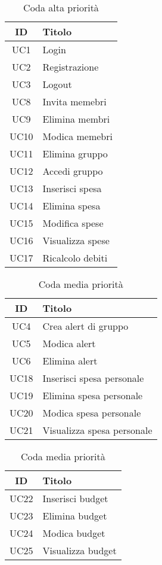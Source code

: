     \begin{table}[h]
        \centering
        \begin{tabular}{|c|l|}
        \hline
        \textbf{ID} & \textbf{Titolo} \\ \hline
        UC1 & Login\\ \hline
        UC2 & Registrazione \\ \hline
        UC3 & Logout \\ \hline
        UC8 & Invita memebri \\ \hline
        UC9 & Elimina membri \\ \hline
        UC10 & Modica memebri \\ \hline
        UC11 & Elimina gruppo \\ \hline
        UC12 & Accedi gruppo \\ \hline
        UC13 & Inserisci spesa \\ \hline
        UC14 & Elimina spesa \\ \hline
        UC15 & Modifica spese \\ \hline
        UC16 & Visualizza spese \\ \hline
        UC17 & Ricalcolo debiti \\ \hline
        \end{tabular}
        \caption{Coda alta priorità}
    \end{table}

    \begin{table}[h]
        \centering
        \begin{tabular}{|c|l|}
        \hline
        \textbf{ID} & \textbf{Titolo} \\ \hline
        UC4 & Crea alert di gruppo\\ \hline
        UC5 & Modica alert \\ \hline
        UC6 & Elimina alert \\ \hline
        UC18 & Inserisci spesa personale \\ \hline
        UC19 & Elimina spesa personale \\ \hline
        UC20 & Modica spesa personale \\ \hline
        UC21 & Visualizza spesa personale \\ \hline
        \end{tabular}
        \caption{Coda media priorità}
    \end{table}

    \begin{table}[h]
        \centering
        \begin{tabular}{|c|l|}
        \hline
        \textbf{ID} & \textbf{Titolo} \\ \hline
        UC22 & Inserisci budget\\ \hline
        UC23 & Elimina budget \\ \hline
        UC24 & Modica budget \\ \hline
        UC25 & Visualizza budget \\ \hline
        \end{tabular}
        \caption{Coda media priorità}
    \end{table}


